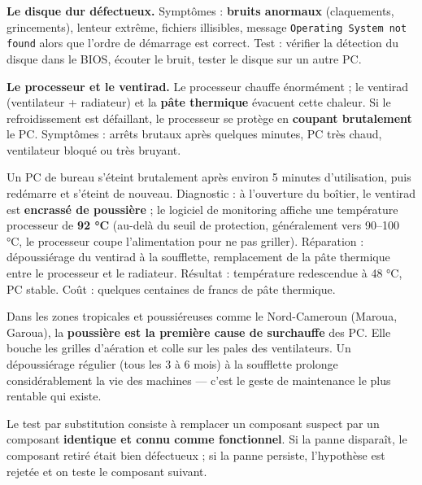 \documentclass[11pt]{article}
\newcommand{\cle}[1]{{\popxbold\color{popdark}#1}}
\newcounter{popsec}
\newcounter{popsub}
\newcommand{\courssub}[1]{%
  \stepcounter{popsub}%
  \par\vspace{9pt}\noindent{\popxbold\fontsize{11.5}{13}\selectfont\color{popink}{\color{poporange}\thepopsec.\thepopsub}\hspace{6pt}#1}\par\nopagebreak\vspace{4pt}
}
\begin{document}
\textbf{Le disque dur défectueux.} Symptômes : \textbf{bruits anormaux} (claquements, grincements), lenteur extrême, fichiers illisibles, message \texttt{Operating System not found} alors que l'ordre de démarrage est correct. Test : vérifier la détection du disque dans le BIOS, écouter le bruit, tester le disque sur un autre PC.

\textbf{Le processeur et le ventirad.} Le processeur chauffe énormément ; le ventirad (ventilateur + radiateur) et la \textbf{pâte thermique} évacuent cette chaleur. Si le refroidissement est défaillant, le processeur se protège en \textbf{coupant brutalement} le PC. Symptômes : arrêts brutaux après quelques minutes, PC très chaud, ventilateur bloqué ou très bruyant.

\begin{exemplebox}
Un PC de bureau s'éteint brutalement après environ 5 minutes d'utilisation, puis redémarre et s'éteint de nouveau. Diagnostic : à l'ouverture du boîtier, le ventirad est \textbf{encrassé de poussière} ; le logiciel de monitoring affiche une température processeur de \textbf{92 °C} (au-delà du seuil de protection, généralement vers 90--100 °C, le processeur coupe l'alimentation pour ne pas griller). Réparation : dépoussiérage du ventirad à la soufflette, remplacement de la pâte thermique entre le processeur et le radiateur. Résultat : température redescendue à 48 °C, PC stable. Coût : quelques centaines de francs de pâte thermique.
\end{exemplebox}

\begin{savaistu}
Dans les zones tropicales et poussiéreuses comme le Nord-Cameroun (Maroua, Garoua), la \textbf{poussière est la première cause de surchauffe} des PC. Elle bouche les grilles d'aération et colle sur les pales des ventilateurs. Un dépoussiérage régulier (tous les 3 à 6 mois) à la soufflette prolonge considérablement la vie des machines — c'est le geste de maintenance le plus rentable qui existe.
\end{savaistu}

\courssub{La méthode du test par substitution}

\begin{definition}
Le \cle{test par substitution} consiste à remplacer un composant suspect par un composant \textbf{identique et connu comme fonctionnel}. Si la panne disparaît, le composant retiré était bien défectueux ; si la panne persiste, l'hypothèse est rejetée et on teste le composant suivant.
\end{definition}
\end{document}
